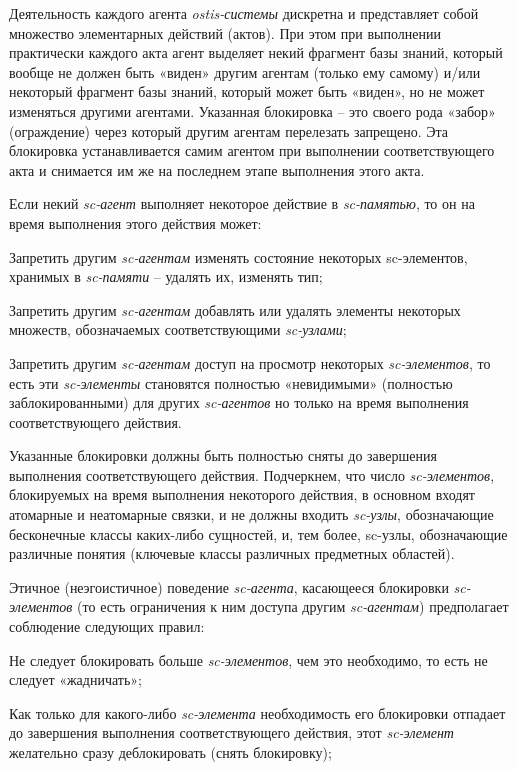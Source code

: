 \begin{SCn}
{\begin{scnitemize}
    \item Деятельность каждого агента \textit{ostis-системы} дискретна и представляет собой множество элементарных действий (актов). При этом при выполнении практически каждого акта агент выделяет некий фрагмент базы знаний, который вообще не должен быть «виден» другим агентам (только ему самому) и/или некоторый фрагмент базы знаний, который может быть «виден», но не может изменяться другими агентами. Указанная блокировка – это своего рода «забор» (ограждение) через который другим агентам перелезать запрещено. Эта блокировка устанавливается самим агентом при выполнении соответствующего акта и снимается им же на последнем этапе выполнения этого акта.
    \item Если некий \textit{sc-агент} выполняет некоторое действие в \textit{sc-памятью}, то он на время выполнения этого действия может:
        \begin{scnenumerate}
            \item Запретить другим \textit{sc-агентам} изменять состояние некоторых sc-элементов, хранимых в \textit{sc-памяти} – удалять их, изменять тип;
            \item Запретить другим \textit{sc-агентам} добавлять или удалять элементы некоторых множеств, обозначаемых соответствующими \textit{sc-узлами};
            \item Запретить другим \textit{sc-агентам} доступ на просмотр некоторых \textit{sc-элементов}, то есть эти \textit{sc-элементы} становятся полностью «невидимыми» (полностью заблокированными) для других \textit{sc-агентов} но только на время выполнения соответствующего действия.
        \end{scnenumerate}
        
    Указанные блокировки должны быть полностью сняты до завершения выполнения соответствующего действия. Подчеркнем, что число \textit{sc-элементов}, блокируемых на время выполнения некоторого действия, в основном входят атомарные и неатомарные связки, и не должны входить \textit{sc-узлы}, обозначающие бесконечные классы каких-либо сущностей, и, тем более, sc-узлы, обозначающие различные понятия (ключевые классы различных предметных областей).
    
    Этичное (неэгоистичное) поведение \textit{sc-агента}, касающееся блокировки \textit{sc-элементов} (то есть ограничения к ним доступа другим \textit{sc-агентам}) предполагает соблюдение следующих правил:
    \begin{scnenumerate}
            \item Не следует блокировать больше \textit{sc-элементов}, чем это необходимо, то есть не следует «жадничать»;
            \item Как только для какого-либо \textit{sc-элемента} необходимость его блокировки отпадает до завершения выполнения соответствующего действия, этот \textit{sc-элемент} желательно сразу деблокировать (снять блокировку);
    \end{scnenumerate}    


\end{scnitemize}}
\end{SCn}

